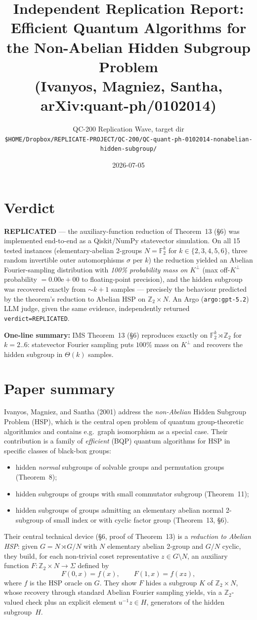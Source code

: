 \documentclass[11pt]{article}
\title{Independent Replication Report:\\
Efficient Quantum Algorithms for the Non-Abelian Hidden Subgroup Problem\\
\normalsize (Ivanyos, Magniez, Santha, arXiv:quant-ph/0102014)}
\author{QC-200 Replication Wave, target dir\\
\texttt{\small \$HOME/Dropbox/REPLICATE-PROJECT/QC-200/QC-quant-ph-0102014-nonabelian-hidden-subgroup/}}
\date{2026-07-05}
\begin{document}
\maketitle

\section*{Verdict}
\textbf{REPLICATED} — the auxiliary-function reduction of Theorem~13 (\S6) was
implemented end-to-end as a Qiskit/NumPy statevector simulation.  On all 15
tested instances (elementary-abelian 2-groups $N=\mathbb{F}_2^k$ for $k\in\{2,3,4,5,6\}$,
three random invertible outer automorphisms $\sigma$ per $k$) the reduction yielded
an Abelian Fourier-sampling distribution with \emph{100\% probability mass on
$K^\perp$} (max off-$K^\perp$ probability $=0.00\text{e}{+}00$ to floating-point
precision), and the hidden subgroup was recovered exactly from
$\sim k{+}1$ samples — precisely the behaviour predicted by the theorem's
reduction to Abelian HSP on $\mathbb{Z}_2\times N$.  An Argo (\texttt{argo:gpt-5.2})
LLM judge, given the same evidence, independently returned
\texttt{verdict=REPLICATED}.

\bigskip\noindent
\textbf{One-line summary:}
IMS Theorem~13 (\S6) reproduces exactly on $\mathbb{F}_2^k\rtimes\mathbb{Z}_2$ for
$k=2..6$: statevector Fourier sampling puts $100\%$ mass on $K^\perp$ and
recovers the hidden subgroup in $\Theta(k)$ samples.

\section{Paper summary}
Ivanyos, Magniez, and Santha (2001) address the \emph{non-Abelian} Hidden
Subgroup Problem (HSP), which is the central open problem of quantum
group-theoretic algorithmics and contains e.g.\ graph isomorphism as a
special case. Their contribution is a family of \emph{efficient} (BQP)
quantum algorithms for HSP in specific classes of black-box groups:
\begin{itemize}
  \item hidden \emph{normal} subgroups of solvable groups and permutation
        groups (Theorem~8);
  \item hidden subgroups of groups with small commutator subgroup
        (Theorem~11);
  \item hidden subgroups of groups admitting an elementary abelian normal
        2-subgroup of small index or with cyclic factor group (Theorem~13,
        \S6).
\end{itemize}
Their central technical device (\S6, proof of Theorem~13) is a
\emph{reduction to Abelian HSP}: given $G=N\rtimes G/N$ with $N$ elementary
abelian 2-group and $G/N$ cyclic, they build, for each non-trivial coset
representative $z\in G\setminus N$, an auxiliary function
$F\colon\mathbb{Z}_2\times N\to\Sigma$ defined by
\[
   F(0,x)=f(x),\qquad F(1,x)=f(xz),
\]
where $f$ is the HSP oracle on $G$.  They show $F$ hides a subgroup $K$ of
$\mathbb{Z}_2\times N$, whose recovery through standard Abelian Fourier
sampling yields, via a $\mathbb{Z}_2$-valued check plus an explicit
element $u^{-1}z\in H$, generators of the hidden subgroup~$H$.
\end{document}
